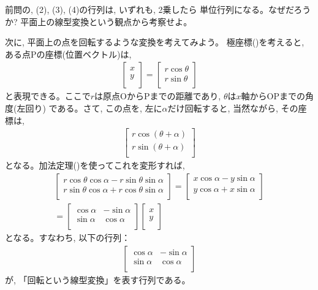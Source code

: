 \begin{q}\label{q:matrix_lintrans2D2} 前問の, (2), (3), (4)の行列は, いずれも, 2乗したら
単位行列になる。なぜだろうか? 平面上の線型変換という観点から考察せよ。\end{q}
\mv

次に, 平面上の点を回転するような変換を考えてみよう。
極座標()を考えると, ある点Pの座標(位置ベクトル)は, 
\begin{eqnarray}
\begin{bmatrix}
x \\
y \\
\end{bmatrix}=
\begin{bmatrix}
r \cos \theta \\
r \sin \theta \\
\end{bmatrix}
\end{eqnarray}
と表現できる。ここで$r$は原点OからPまでの距離であり, $\theta$は$x$軸からOPまでの角度(左回り)
である。さて, この点を, 左に$\alpha$だけ回転すると, 当然ながら, その座標は, 
\begin{eqnarray}
\begin{bmatrix}
r \cos (\theta+\alpha) \\
r \sin (\theta+\alpha) \\
\end{bmatrix}
\end{eqnarray}
となる。加法定理()を使ってこれを変形すれば, 
\begin{eqnarray*}
\begin{bmatrix}
r \cos \theta \cos \alpha - r \sin \theta \sin \alpha\\
r \sin \theta \cos \alpha + r \cos \theta \sin \alpha\\
\end{bmatrix}=
\begin{bmatrix}
x \cos \alpha - y \sin \alpha\\
y \cos \alpha + x \sin \alpha\\
\end{bmatrix}\\
=\begin{bmatrix}
\cos \alpha & -\sin \alpha\\
\sin \alpha & \cos \alpha\\
\end{bmatrix}
\begin{bmatrix}
x\\
y\\
\end{bmatrix}
\end{eqnarray*}
となる。すなわち, 以下の行列：
\begin{eqnarray}
\begin{bmatrix}
\cos \alpha & -\sin \alpha\\
\sin \alpha & \cos \alpha\\
\end{bmatrix}\label{eq:2Drotmatrix}
\end{eqnarray}
が, 「回転という線型変換」を表す行列である。

